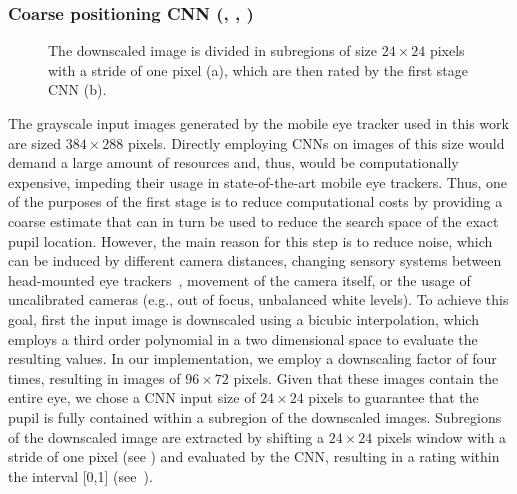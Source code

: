 \subsubsection{Coarse positioning CNN (, , )}
\label{subsec:coarsestage}
\begin{figure}[h]
	\begin{center}
		\hfill
		\hfill
		\hfill{}
		\caption{
			The downscaled image is divided in subregions of size $24\times24$
			pixels with a stride of one pixel (a), which are then rated by the
			first stage CNN (b).
		}
	\end{center}
\end{figure}
The grayscale input images generated by the mobile eye tracker used in this work
are sized $384\times288$ pixels.
Directly employing CNNs on images of this size would demand a large amount of
resources and, thus, would be computationally expensive, impeding their usage in
state-of-the-art mobile eye trackers. Thus, one of the purposes of the first
stage is to reduce computational costs by providing a coarse estimate that can
in turn be used to reduce the search space of the exact pupil location.
However, the main reason for this step is to reduce noise, which can be induced
by different camera distances, changing sensory systems between head-mounted eye
trackers~\citet{boie1992analysis,dussault2004noise,reibel2003ccd}, movement of the
camera itself, or the usage of uncalibrated cameras (e.g., out of focus,
unbalanced white levels).
To achieve this goal, first the input image is downscaled using a bicubic
interpolation, which employs a third order polynomial in a two dimensional space
to evaluate the resulting values.
In our implementation, we employ a downscaling factor of four times, resulting
in images of $96\times72$ pixels.
Given that these images contain the entire eye, we chose a CNN input size of
$24\times24$ pixels to guarantee that the pupil is fully contained within a
subregion of the downscaled images.
Subregions of the downscaled image are extracted by shifting a $24\times24$
pixels window with a stride of one pixel (see ) and evaluated
by the CNN, resulting in a rating within the interval [0,1]
(see~).

